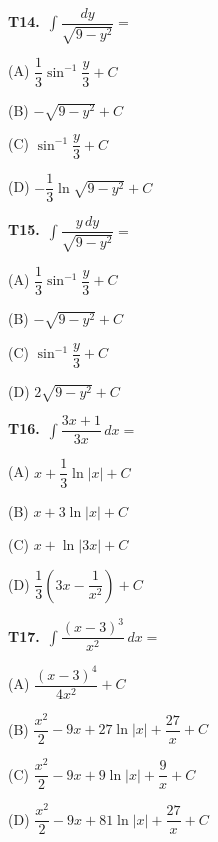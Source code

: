 \documentclass[11pt]{article}
\begin{document}
\bigskip\noindent\textbf{T14.}\ $\displaystyle\int \dfrac{dy}{\sqrt{9-y^2}} =$
\begin{list}{}{\setlength{\leftmargin}{3em}\setlength{\labelwidth}{2.5em}\setlength{\itemsep}{0pt}\setlength{\topsep}{2pt}}
\item[(A)] $\dfrac{1}{3}\sin^{-1}\dfrac{y}{3}+C$
\item[(B)] $-\sqrt{9-y^2}+C$
\item[(C)] $\sin^{-1}\dfrac{y}{3}+C$
\item[(D)] $-\dfrac{1}{3}\ln\sqrt{9-y^2}+C$
\end{list}

\bigskip\noindent\textbf{T15.}\ $\displaystyle\int \dfrac{y\,dy}{\sqrt{9-y^2}} =$
\begin{list}{}{\setlength{\leftmargin}{3em}\setlength{\labelwidth}{2.5em}\setlength{\itemsep}{0pt}\setlength{\topsep}{2pt}}
\item[(A)] $\dfrac{1}{3}\sin^{-1}\dfrac{y}{3}+C$
\item[(B)] $-\sqrt{9-y^2}+C$
\item[(C)] $\sin^{-1}\dfrac{y}{3}+C$
\item[(D)] $2\sqrt{9-y^2}+C$
\end{list}

\bigskip\noindent\textbf{T16.}\ $\displaystyle\int \dfrac{3x+1}{3x}\,dx =$
\begin{list}{}{\setlength{\leftmargin}{3em}\setlength{\labelwidth}{2.5em}\setlength{\itemsep}{0pt}\setlength{\topsep}{2pt}}
\item[(A)] $x+\dfrac{1}{3}\ln|x|+C$
\item[(B)] $x+3\ln|x|+C$
\item[(C)] $x+\ln|3x|+C$
\item[(D)] $\dfrac{1}{3}\left(3x-\dfrac{1}{x^2}\right)+C$
\end{list}

\bigskip\noindent\textbf{T17.}\ $\displaystyle\int \dfrac{(x-3)^3}{x^2}\,dx =$
\begin{list}{}{\setlength{\leftmargin}{3em}\setlength{\labelwidth}{2.5em}\setlength{\itemsep}{0pt}\setlength{\topsep}{2pt}}
\item[(A)] $\dfrac{(x-3)^4}{4x^2}+C$
\item[(B)] $\dfrac{x^2}{2}-9x+27\ln|x|+\dfrac{27}{x}+C$
\item[(C)] $\dfrac{x^2}{2}-9x+9\ln|x|+\dfrac{9}{x}+C$
\item[(D)] $\dfrac{x^2}{2}-9x+81\ln|x|+\dfrac{27}{x}+C$
\end{list}
\end{document}
